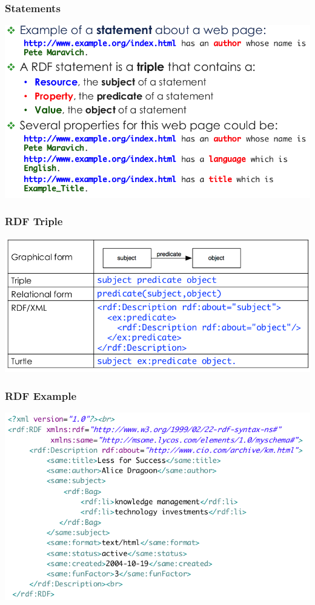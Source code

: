 \documentclass{article}
\begin{document}
\pagebreak

\subsubsection*{Statements}

\begin{center}
  \includegraphics[scale=0.25]{61}
\end{center}

\subsubsection*{RDF Triple}

\begin{center}
  \includegraphics[scale=0.25]{62}
\end{center}

\subsubsection*{RDF Example}

\begin{center}
  \includegraphics[scale=0.25]{63}
\end{center}
\end{document}
